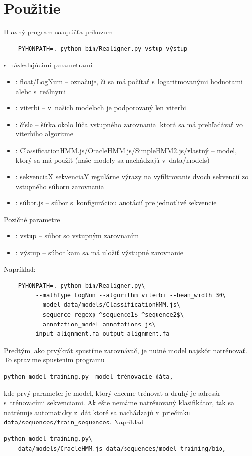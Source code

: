 \section{Použitie}

Hlavný program sa spúšťa príkazom
\begin{verbatim}
    PYHONPATH=. python bin/Realigner.py vstup výstup
\end{verbatim}
s~následujúcimi parametrami
\begin{itemize}
    \item {}: float/LogNum -- označuje, či sa má počítať s~logaritmovanými hodnotami alebo s~reálnymi
    \item {}: viterbi -- v~našich modeloch je podporovaný len viterbi
    \item {}: číslo -- šírka okolo lúča vstupného zarovnania, ktorá sa má prehľadávať vo viterbiho algoritme
    \item {}: ClassificationHMM.js/OracleHMM.js/SimpleHMM2.js/vlastný -- model, ktorý sa má použiť (naše modely sa nachádzajú v~data/models)
    \item {}: sekvenciaX sekvenciaY regulárne výrazy na vyfiltrovanie dvoch sekvencií zo vstupného súboru zarovnania
    \item {}: súbor.js -- súbor s~konfiguráciou anotácií pre jednotlivé sekvencie
\end{itemize}
Pozičné parametre
\begin{itemize}
    \item {}: vstup -- súbor so vstupným zarovnaním
    \item {}: výstup -- súbor kam sa má uložiť výstupné zarovnanie
\end{itemize}
Napríklad:
\begin{verbatim}
    PYHONPATH=. python bin/Realigner.py\
         --mathType LogNum --algorithm viterbi --beam_width 30\
         --model data/models/ClassificationHMM.js\
         --sequence_regexp ^sequence1$ ^sequence2$\
         --annotation_model annotations.js\
         input_alignment.fa output_alignment.fa
\end{verbatim}

Predtým, ako prvýkrát spustíme zarovnávač, je nutné model najskôr natrénovať. To spravíme spustením programu
\begin{verbatim}
python model_training.py  model trénovacie_dáta,
\end{verbatim}
kde prvý parameter je model, ktorý chceme trénovať a druhý je adresár s~trénovacími sekvenciami. Ak ešte nemáme natrénovaný klasifikátor, tak sa natrénuje automaticky z~dát ktoré sa nachádzajú v~priečinku {\tt data/sequences/train\_sequences}. Napríklad
\begin{verbatim}
python model_training.py\
    data/models/OracleHMM.js data/sequences/model_training/bio,
\end{verbatim}


